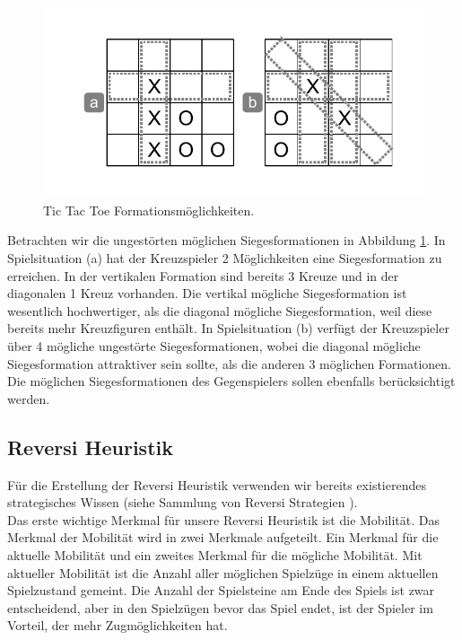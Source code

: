 \begin{figure}[!htbp]
  \centering
  \includegraphics[scale = 0.7]{inhalt/abbildungen/tictactoe_formations.pdf}
  \caption{Tic Tac Toe Formationsmöglichkeiten.}
  \label{fig:tictactoe_formations}
\end{figure}

Betrachten wir die ungestörten möglichen Siegesformationen in Abbildung \ref{fig:tictactoe_formations}. In Spielsituation (a) hat der Kreuzspieler 2 Möglichkeiten eine Siegesformation zu erreichen. In der vertikalen Formation sind bereits 3 Kreuze und in der diagonalen 1 Kreuz vorhanden. Die vertikal mögliche Siegesformation ist wesentlich hochwertiger, als die diagonal mögliche Siegesformation, weil diese bereits mehr Kreuzfiguren enthält. In Spielsituation (b) verfügt der Kreuzspieler über 4 mögliche ungestörte Siegesformationen, wobei die diagonal mögliche Siegesformation attraktiver sein sollte, als die anderen 3 möglichen Formationen. Die möglichen Siegesformationen des Gegenspielers sollen ebenfalls berücksichtigt werden.

\subsection{Reversi Heuristik}
\label{subsec:Reversi Heuristik}
Für die Erstellung der Reversi Heuristik verwenden wir bereits existierendes strategisches Wissen (siehe Sammlung von Reversi Strategien \cite{MacGuire}). \\

Das erste wichtige Merkmal für unsere Reversi Heuristik ist die Mobilität. Das Merkmal der Mobilität wird in zwei Merkmale aufgeteilt. Ein Merkmal für die aktuelle Mobilität und ein zweites Merkmal für die mögliche Mobilität. Mit aktueller Mobilität ist die Anzahl aller möglichen Spielzüge in einem aktuellen Spielzustand gemeint. Die Anzahl der Spielsteine am Ende des Spiels ist zwar entscheidend, aber in den Spielzügen bevor das Spiel endet, ist der Spieler im Vorteil, der mehr Zugmöglichkeiten hat. \\

